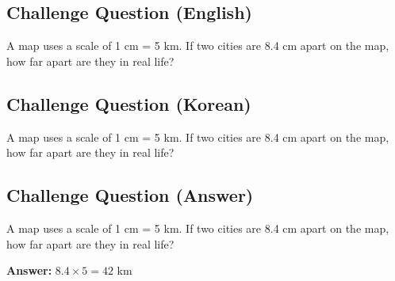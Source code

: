 \cleardoublepage
\subsection*{Challenge Question (English)}
A map uses a scale of 1 cm = 5 km. If two cities are 8.4 cm apart on the map, how far apart are they in real life?


\newpage
\subsection*{Challenge Question (Korean)}
A map uses a scale of 1 cm = 5 km. If two cities are 8.4 cm apart on the map, how far apart are they in real life?


\newpage
\subsection*{Challenge Question (Answer)}
A map uses a scale of 1 cm = 5 km. If two cities are 8.4 cm apart on the map, how far apart are they in real life?

\textbf{Answer:} $8.4 \times 5 = 42$ km
